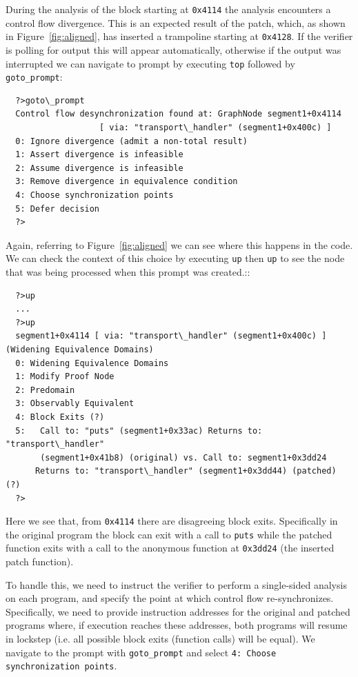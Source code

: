 During the analysis of the block starting at \texttt{0x4114} the analysis encounters
a control flow divergence. This is an expected result of the patch,
which, as shown in Figure~\ref{fig:aligned}, has
inserted a trampoline starting at \texttt{0x4128}. If the verifier is polling for output
this will appear automatically, otherwise if the output was interrupted we can
navigate to prompt by executing \texttt{top} followed by \texttt{goto\_prompt}:
\begin{verbatim}
  ?>goto\_prompt
  Control flow desynchronization found at: GraphNode segment1+0x4114 
                   [ via: "transport\_handler" (segment1+0x400c) ]
  0: Ignore divergence (admit a non-total result) 
  1: Assert divergence is infeasible 
  2: Assume divergence is infeasible 
  3: Remove divergence in equivalence condition 
  4: Choose synchronization points 
  5: Defer decision 
  ?>
\end{verbatim}
Again, referring to Figure~\ref{fig:aligned} we can see where this happens in the code.  We can check
the context of this choice by executing \texttt{up} then \texttt{up} to see the node that was being
processed when this prompt was created.::
\begin{verbatim}
  ?>up
  ...
  ?>up
  segment1+0x4114 [ via: "transport\_handler" (segment1+0x400c) ] (Widening Equivalence Domains)
  0: Widening Equivalence Domains
  1: Modify Proof Node
  2: Predomain
  3: Observably Equivalent
  4: Block Exits (?)
  5:   Call to: "puts" (segment1+0x33ac) Returns to: "transport\_handler" 
       (segment1+0x41b8) (original) vs. Call to: segment1+0x3dd24 
      Returns to: "transport\_handler" (segment1+0x3dd44) (patched) (?)
  ?>
\end{verbatim}

Here we see that, from \texttt{0x4114} there are disagreeing block exits. Specifically in the original
program the block can exit with a call to \texttt{puts} while the patched function exits with a call to the
anonymous function at \texttt{0x3dd24} (the inserted patch function).

To handle this, we need to instruct the verifier to perform a single-sided analysis on each program, and specify
the point at which control flow re-synchronizes. Specifically, we need to provide instruction addresses for the
original and patched programs where, if execution reaches these addresses, both programs will resume in lockstep
(i.e. all possible block exits (function calls) will be equal). We navigate to the prompt with \texttt{goto\_prompt}
and select \texttt{4: Choose synchronization points}.

